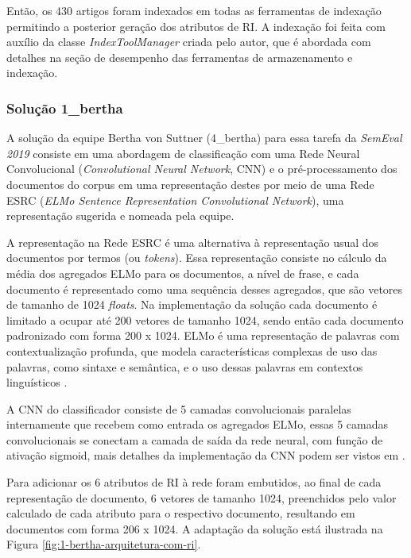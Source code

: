 			Então, os 430 artigos foram indexados em todas as ferramentas de indexação permitindo a posterior geração dos atributos de RI.
			A indexação foi feita com auxílio da classe \textit{IndexToolManager} criada pelo autor, que é abordada com detalhes na seção de desempenho das ferramentas de armazenamento e indexação.
			
			\subsubsection{Solução 1\_bertha}
				A solução da equipe Bertha von Suttner (4\_bertha) para essa tarefa da \textit{SemEval 2019} consiste em uma abordagem de classificação com uma Rede Neural Convolucional (\textit{Convolutional Neural Network}, CNN) e o pré-processamento dos documentos do corpus em uma representação destes por meio de uma Rede ESRC (\textit{ELMo Sentence Representation Convolutional Network}), uma representação sugerida e nomeada pela equipe.

				A representação na Rede ESRC é uma alternativa à representação usual dos documentos por termos (ou \textit{tokens}).
				Essa representação consiste no cálculo da média dos agregados ELMo para os documentos, a nível de frase, e cada documento é representado como uma sequência desses agregados, que são vetores de tamanho de 1024 \textit{floats}. 
				Na implementação da solução cada documento é limitado a ocupar até 200 vetores de tamanho 1024, sendo então cada documento padronizado com forma 200 x 1024.
				ELMo é uma representação de palavras com contextualização profunda, que modela características complexas de uso das palavras, como sintaxe e semântica, e o uso dessas palavras em contextos linguísticos \cite{ELMoDBLP:journals/corr/abs-1802-05365}.

				A CNN do classificador consiste de 5 camadas convolucionais paralelas internamente que recebem como entrada os agregados ELMo, essas 5 camadas convolucionais se conectam a camada de saída da rede neural, com função de ativação sigmoid, mais detalhes da implementação da CNN podem ser vistos em .

				Para adicionar os 6 atributos de RI à rede foram embutidos, ao final de cada representação de documento, 6 vetores de tamanho 1024, preenchidos pelo valor calculado de cada atributo para o respectivo documento, resultando em documentos com forma 206 x 1024.
				A adaptação da solução está ilustrada na Figura \ref{fig:1-bertha-arquitetura-com-ri}.
				
